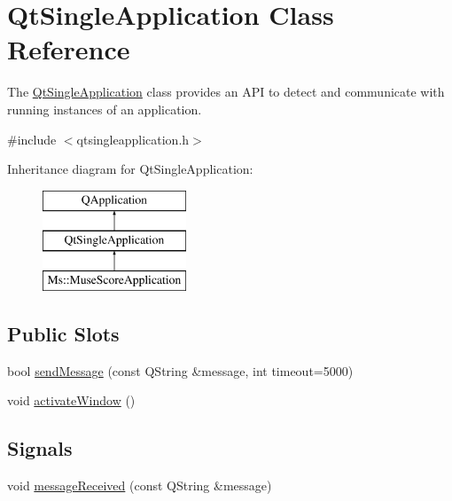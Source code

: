 \hypertarget{class_qt_single_application}{}\section{Qt\+Single\+Application Class Reference}
\label{class_qt_single_application}


The \hyperlink{class_qt_single_application}{Qt\+Single\+Application} class provides an A\+PI to detect and communicate with running instances of an application.  




{\ttfamily \#include $<$qtsingleapplication.\+h$>$}

Inheritance diagram for Qt\+Single\+Application\+:\begin{figure}[H]
\begin{center}
\leavevmode
\includegraphics[height=3.000000cm]{class_qt_single_application}
\end{center}
\end{figure}
\subsection*{Public Slots}
\begin{DoxyCompactItemize}
\item 
bool \hyperlink{class_qt_single_application_a0e2f3900f0290913c738ec6b4b959922}{send\+Message} (const Q\+String \&message, int timeout=5000)
\item 
void \hyperlink{class_qt_single_application_a0881b32c76132b499f3180064006abc1}{activate\+Window} ()
\end{DoxyCompactItemize}
\subsection*{Signals}
\begin{DoxyCompactItemize}
\item 
void \hyperlink{class_qt_single_application_a69340cef3d26d026e11424930e5a5866}{message\+Received} (const Q\+String \&message)
\end{DoxyCompactItemize}
